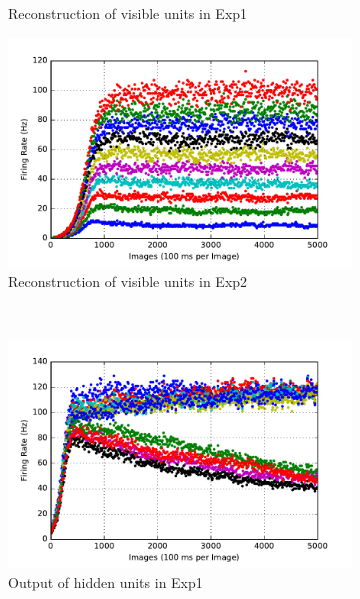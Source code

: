 \begin{figure}
\begin{subfigure}[t]{0.4\textwidth}
		\caption{Reconstruction of visible units in Exp1}
	\end{subfigure}
	\begin{subfigure}[t]{0.4\textwidth}
		\includegraphics[width=\textwidth]{pics_sdlm/17_exp_SRBM_all_long/exp2_recon_s.pdf}
		\caption{Reconstruction of visible units in Exp2}
	\end{subfigure}\\
	\begin{subfigure}[t]{0.4\textwidth}
		\includegraphics[width=\textwidth]{pics_sdlm/17_exp_SRBM_all_long/exp1_hid_s.pdf}
		\caption{Output of hidden units in Exp1}
	\end{subfigure}
	\begin{subfigure}[t]{0.4\textwidth}

\end{subfigure}
\end{figure}
